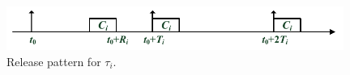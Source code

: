 \begin{figure}[!ht]
\captionsetup{belowskip=-1pt}
\begin{center}
\includegraphics[width=11cm]{max_interference}
\caption{Release pattern for $\tau_i$.}
\label{fig:max_interference}
\end{center}
\end{figure}
